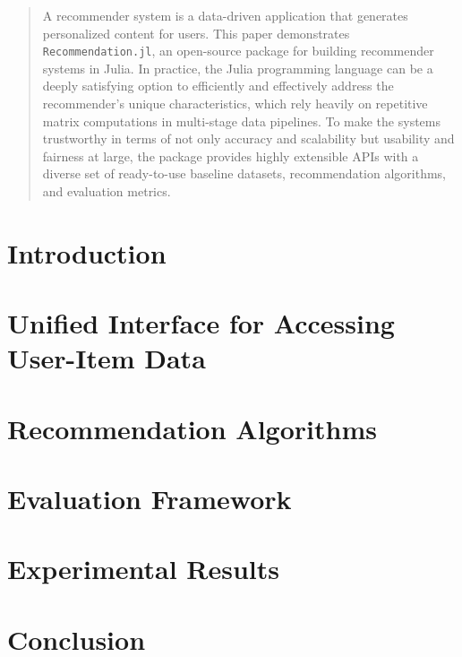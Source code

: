 \documentclass{juliacon}
\begin{document}


\maketitle

\begin{abstract}
A recommender system is a data-driven application that generates personalized content for users. This paper demonstrates \texttt{Recommendation.jl}, an open-source package for building recommender systems in Julia. In practice, the Julia programming language can be a deeply satisfying option to efficiently and effectively address the recommender's unique characteristics, which rely heavily on repetitive matrix computations in multi-stage data pipelines. To make the systems trustworthy in terms of not only accuracy and scalability but usability and fairness at large, the package provides highly extensible APIs with a diverse set of ready-to-use baseline datasets, recommendation algorithms, and evaluation metrics.
\end{abstract}

\section{Introduction}
\label{sec:introduction}


\section{Unified Interface for Accessing User-Item Data}
\label{sec:data}


\section{Recommendation Algorithms}
\label{sec:algorithm}


\section{Evaluation Framework}
\label{sec:evaluation}


\section{Experimental Results}
\label{sec:experiment}


\section{Conclusion}



\end{document}
